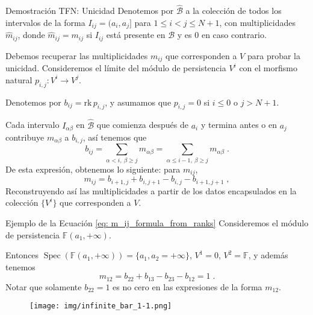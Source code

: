 \documentclass{beamer}
\DeclareMathOperator{\rk}{rank} \DeclareMathOperator{\tr}{tr}
\DeclareMathOperator{\Spec}{Spec}
\newcommand{\calB}{{\mathcal{B}}}
\def\F {\mathbb{F}}
\def \rk{{\mbox {rk}}\,}
\begin{document}
\begin{frame}{Demostración TFN: Unicidad}
Denotemos por $\hat \calB$ a la colección de todos los intervalos de la forma $I_{ij}=(a_i, a_j]$ para $1\leq i<j\leq N+1$, con multiplicidades $\hat m_{ij}$, donde $\hat m_{ij} = m_{ij}$ si $I_{ij}$ está presente en $\calB$ y es $0$ en caso contrario. \\[0.2cm] \pause

Debemos recuperar las multiplicidades $m_{ij}$ que corresponden a $V$ para probar la unicidad. Consideremos el límite del módulo de persistencia ${V^i}$ con el morfismo natural $p_{i,j}: V^i \to V^j$.\\[0.2cm] \pause 

Denotemos por $b_{ij} = \rk p_{i,j}$, y asumamos que $p_{i,j} = 0$ si $i\leq0$ o $j>N+1$.
\end{frame}


\begin{frame}{}
Cada intervalo $I_{\alpha \beta}$ en $\hat \calB$ que comienza después de $a_i$ y termina antes o en $a_j$ contribuye $m_{\alpha \beta}$ a $b_{i,j}$, \pause así tenemos que 
\begin{equation} \label{eq: b_ij_formula}
    b_{ij} = \sum_{\alpha < i,\ \beta \geq j} m_{\alpha \beta} = \sum_{\alpha \leq i-1,\ \beta \geq j} m_{\alpha \beta} \;.
\end{equation}
\pause
De esta expresión, obtenemos lo siguiente: para $m_{ij}$,
	\begin{equation} \label{eq: m_ij_formula_from_ranks}
		m_{ij} = b_{i+1,j} + b_{i,j+1} - b_{i,j} - b_{i+1,j+1} \;,
	\end{equation}
\pause
Reconstruyendo así las multiplicidades a partir de los datos encapsulados en la colección $\{V^i\}$ que corresponden a $V$.
\end{frame}

\begin{frame}{Ejemplo de la Ecuación \ref{eq: m_ij_formula_from_ranks}}
    Consideremos el módulo de persistencia $\F(a_1, +\infty)$. \pause 
    
    Entonces $\Spec \left( \F(a_1, +\infty) \right) = \{a_1, a_2=+\infty\} $, $V^1 = {0}$, $V^2 = \F$, y además tenemos 
	$$
		m_{12} = b_{22} + b_{13} - b_{23} - b_{12} = 1 \;.
	$$
 \pause
Notar que solamente $b_{22} = 1$ es no cero en las expresiones de la forma $m_{12}$. 
    \begin{figure}[!ht]
		\centering
		\texttt{[image: img/infinite\_bar\_1-1.png]}
		\label{fig: one_infinite_bar_spec}
	\end{figure}


\end{frame}
\end{document}
